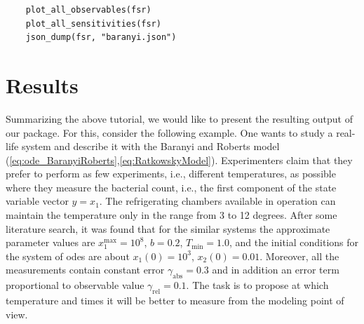 \documentclass[10pt,A4paper]{article}
\begin{document}
\begin{verbatim}
    plot_all_observables(fsr)
    plot_all_sensitivities(fsr)
    json_dump(fsr, "baranyi.json")
\end{verbatim}
%
%
%
\section*{Results}
Summarizing the above tutorial, we would like to present the resulting output of our package.
For this, consider the following example.
One wants to study a real-life system and describe it with the Baranyi and Roberts model (\ref{eq:ode_BaranyiRoberts},\ref{eq:RatkowskyModel}).
Experimenters claim that they prefer to perform as few experiments, i.e., different temperatures, as possible where they measure the bacterial count, i.e., the first component of the state variable vector $y = x_1$.
The refrigerating chambers available in operation can maintain the temperature only in the range from 3 to 12 degrees.
After some literature search, it was found that for the similar systems the approximate parameter values are $x_1^\text{max}=10^8$, $b=0.2$, $T_\text{min}=1.0$,
and the initial conditions for the system of \acp{ode} are about $x_1(0) = 10^3$, $x_2(0)=0.01$.
Moreover, all the measurements contain constant error $\gamma_\text{abs}=0.3$ and in addition an error term proportional to observable value $\gamma_\text{rel}=0.1$.
The task is to propose at which temperature and times it will be better to measure from the modeling point of view.
\end{document}
